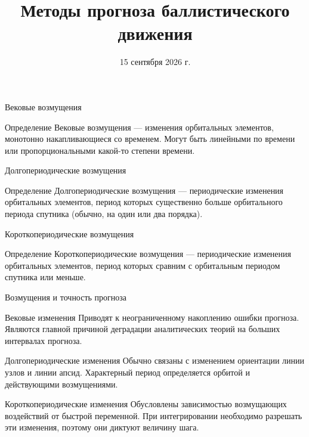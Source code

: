\documentclass[11pt,aspectratio=169,t]{beamer}
\title{Методы прогноза баллистического движения}
\date{15 сентября 2026 г.}
\begin{document}
\begin{frame}[plain]
\titlepage
\end{frame}

\begin{frame}{Вековые возмущения}
\centering\par
\begin{block}{Определение}
\justifying
Вековые возмущения --- изменения орбитальных элементов, монотонно накапливающиеся со временем. Могут быть линейными по времени или пропорциональными какой-то степени времени.
\end{block}
\end{frame}

\begin{frame}{Долгопериодические возмущения}
\centering\par
\begin{block}{Определение}
\justifying
Долгопериодические возмущения --- периодические изменения орбитальных элементов, период которых существенно больше орбитального периода спутника (обычно, на один или два порядка).
\end{block}
\end{frame}

\begin{frame}{Короткопериодические возмущения}
\centering\par
\begin{block}{Определение}
\justifying
Короткопериодические возмущения --- периодические изменения орбитальных элементов, период которых сравним с орбитальным периодом спутника или меньше.
\end{block}
\end{frame}

\begin{frame}{Возмущения и точность прогноза}
\begin{block}{Вековые изменения}
\justifying
Приводят к неограниченному накоплению ошибки прогноза. Являются главной причиной деградации аналитических теорий на больших интервалах прогноза.
\end{block}
\begin{block}{Долгопериодические изменения}
\justifying
Обычно связаны с изменением ориентации линии узлов и линии апсид. Характерный период определяется орбитой и действующими возмущениями.
\end{block}
\begin{block}{Короткопериодические изменения}
\justifying
Обусловлены зависимостью возмущающих воздействий от быстрой переменной. При интегрировании необходимо разрешать эти изменения, поэтому они диктуют величину шага.
\end{block}
\end{frame}
\end{document}
